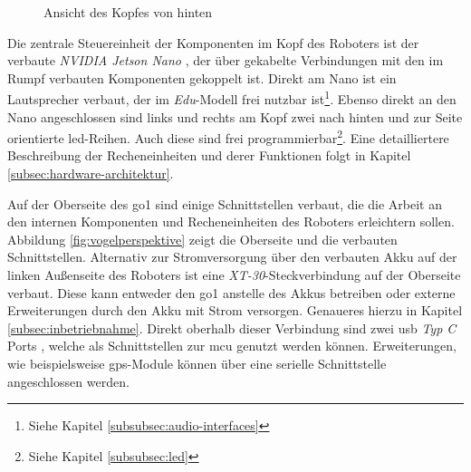 \begin{figure}[h]
    \caption{Ansicht des Kopfes von hinten}\label{fig:kopf}
\end{figure}

Die zentrale Steuereinheit der Komponenten im Kopf des Roboters ist der verbaute \emph{NVIDIA Jetson Nano} , der
über gekabelte Verbindungen  mit den im Rumpf verbauten Komponenten gekoppelt ist.
Direkt am Nano ist ein Lautsprecher  verbaut, der im \emph{Edu}-Modell frei nutzbar ist\footnote{Siehe Kapitel \ref{subsubsec:audio-interfaces}}.
Ebenso direkt an den Nano angeschlossen sind links und rechts am Kopf zwei nach hinten und zur Seite orientierte
\gls{led}-Reihen.
Auch diese sind frei programmierbar\footnote{Siehe Kapitel \ref{subsubsec:led}}.
Eine detailliertere Beschreibung der Recheneinheiten und derer Funktionen folgt in Kapitel \ref{subsec:hardware-architektur}.

Auf der Oberseite des \gls{go1} sind einige Schnittstellen verbaut, die die Arbeit an den internen Komponenten und
Recheneinheiten des Roboters erleichtern sollen.
Abbildung \ref{fig:vogelperspektive} zeigt die Oberseite und die verbauten Schnittstellen.
Alternativ zur Stromversorgung über den verbauten Akku  auf der linken Außenseite des Roboters ist eine
\emph{XT-30}-Steckverbindung  auf der Oberseite verbaut.
Diese kann entweder den \gls{go1} anstelle des Akkus betreiben oder externe Erweiterungen durch den Akku mit Strom versorgen.
Genaueres hierzu in Kapitel \ref{subsec:inbetriebnahme}.
Direkt oberhalb dieser Verbindung sind zwei \gls{usb} \emph{Typ C} Ports , welche als Schnittstellen zur \gls{mcu} genutzt werden können.
Erweiterungen, wie beispielsweise \gls{gps}-Module können über eine serielle Schnittstelle  angeschlossen werden.

